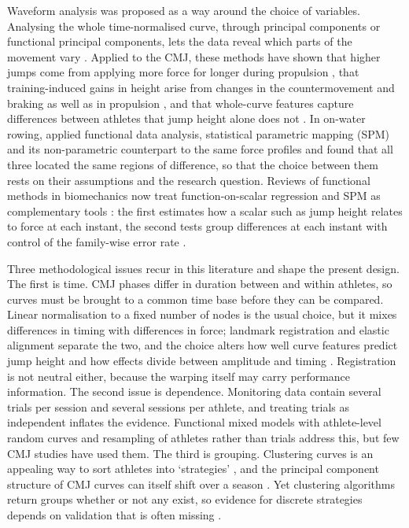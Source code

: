 Waveform analysis was proposed as a way around the choice of variables. Analysing the whole time-normalised curve, through principal components or functional principal components, lets the data reveal which parts of the movement vary \parencite{ramsay2005,warmenhoven2019}. Applied to the CMJ, these methods have shown that higher jumps come from applying more force for longer during propulsion \parencite{richter2014}, that training-induced gains in height arise from changes in the countermovement and braking as well as in propulsion \parencite{floria2019}, and that whole-curve features capture differences between athletes that jump height alone does not \parencite{parker2018}. In on-water rowing, \textcite{warmenhoven2018} applied functional data analysis, statistical parametric mapping (SPM) and its non-parametric counterpart to the same force profiles and found that all three located the same regions of difference, so that the choice between them rests on their assumptions and the research question. Reviews of functional methods in biomechanics now treat function-on-scalar regression and SPM as complementary tools \parencite{gunning2024,morris2015}: the first estimates how a scalar such as jump height relates to force at each instant, the second tests group differences at each instant with control of the family-wise error rate \parencite{pataky2012,pataky2015,nichols2002}.

Three methodological issues recur in this literature and shape the present design. The first is time. CMJ phases differ in duration between and within athletes, so curves must be brought to a common time base before they can be compared. Linear normalisation to a fixed number of nodes is the usual choice, but it mixes differences in timing with differences in force; landmark registration and elastic alignment separate the two, and the choice alters how well curve features predict jump height \parencite{moudy2018,white2022,white2020isbs} and how effects divide between amplitude and timing \parencite{pataky2022}. Registration is not neutral either, because the warping itself may carry performance information. The second issue is dependence. Monitoring data contain several trials per session and several sessions per athlete, and treating trials as independent inflates the evidence. Functional mixed models with athlete-level random curves \parencite{di2009,goldsmith2011,scheipl2015,morris2006} and resampling of athletes rather than trials address this, but few CMJ studies have used them. The third is grouping. Clustering curves is an appealing way to sort athletes into `strategies' \parencite{jacques2014}, and the principal component structure of CMJ curves can itself shift over a season \parencite{kipp2015isbs}. Yet clustering algorithms return groups whether or not any exist, so evidence for discrete strategies depends on validation that is often missing \parencite{hennig2007,tibshirani2001}.

